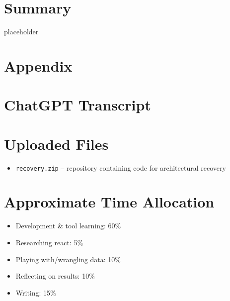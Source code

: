 \documentclass{article}
\begin{document}
\section{Summary}
placeholder





\clearpage
\appendix
\section*{Appendix}

\section{ChatGPT Transcript}
\label{apx:a}


\section{Uploaded Files}
\label{apx:b}
\begin{itemize}
  \item \verb|recovery.zip| -- repository containing code for architectural recovery
\end{itemize}

\section{Approximate Time Allocation}
\label{apx:c}
\begin{itemize}
  \item Development \& tool learning: 60\%
  \item Researching react: 5\%
  \item Playing with/wrangling data: 10\%
  \item Reflecting on results: 10\%
  \item Writing: 15\%
\end{itemize}
\end{document}
